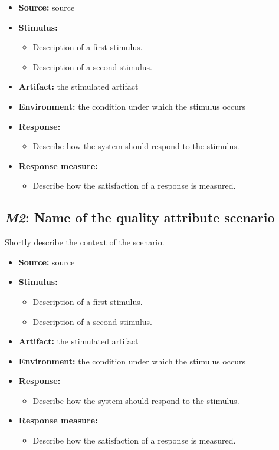 \documentclass[english]{sareport}
\begin{document}
\begin{itemize}
    \item \textbf{Source:} source
    \item \textbf{Stimulus:}
        \begin{itemize}
            \item Description of a first stimulus.
            \item Description of a second stimulus.
        \end{itemize}

    \item \textbf{Artifact:} the stimulated artifact
    \item \textbf{Environment:} the condition under which the stimulus occurs
    \item \textbf{Response:}
        \begin{itemize}
            \item Describe how the system should respond to the stimulus.
        \end{itemize}

    \item \textbf{Response measure:}
        \begin{itemize}
            \item Describe how the satisfaction of a response is measured.
        \end{itemize}
\end{itemize}

\subsection{\emph{M2}: Name of the quality attribute scenario}
Shortly describe the context of the scenario.

\begin{itemize}
    \item \textbf{Source:} source
    \item \textbf{Stimulus:}
        \begin{itemize}
            \item Description of a first stimulus.
            \item Description of a second stimulus.
        \end{itemize}

    \item \textbf{Artifact:} the stimulated artifact
    \item \textbf{Environment:} the condition under which the stimulus occurs
    \item \textbf{Response:}
        \begin{itemize}
            \item Describe how the system should respond to the stimulus.
        \end{itemize}

    \item \textbf{Response measure:}
        \begin{itemize}
            \item Describe how the satisfaction of a response is measured.
        \end{itemize}
\end{itemize}
\end{document}

